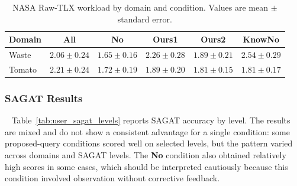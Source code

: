 \begin{table}[t]
\centering
\caption{NASA Raw-TLX workload by domain and condition. Values are mean $\pm$ standard error.}
\label{tab:user_workload_sa}
\footnotesize
\setlength{\tabcolsep}{2pt}
\begin{tabular*}{\columnwidth}{@{\extracolsep{\fill}}lccccc}
\toprule
\textbf{Domain} & \textbf{All} & \textbf{No} & \textbf{Ours1} & \textbf{Ours2} & \textbf{KnowNo} \\
\midrule
Waste & $2.06 \pm 0.24$ & $1.65 \pm 0.16$ & $2.26 \pm 0.28$ & $1.89 \pm 0.21$ & $2.54 \pm 0.29$ \\
Tomato & $2.21 \pm 0.24$ & $1.72 \pm 0.19$ & $1.89 \pm 0.20$ & $1.81 \pm 0.15$ & $1.81 \pm 0.17$ \\
\bottomrule
\end{tabular*}
\end{table}

\subsubsection{SAGAT Results}~\label{user:results_sagat_levels}
Table~\ref{tab:user_sagat_levels} reports SAGAT accuracy by level. The results are mixed and do not show a consistent advantage for a single condition: some proposed-query conditions scored well on selected levels, but the pattern varied across domains and SAGAT levels. The \textbf{No} condition also obtained relatively high scores in some cases, which should be interpreted cautiously because this condition involved observation without corrective feedback.

